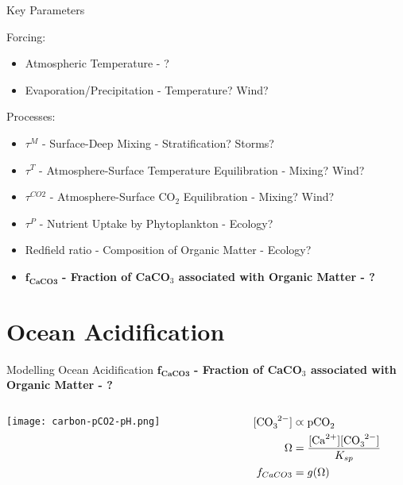 \begin{frame}{Key Parameters}
    
    Forcing:
    \begin{itemize}
        \item Atmospheric Temperature - {\color{QESdarkblue} ?}
        \item Evaporation/Precipitation - {\color{QESdarkblue} Temperature? Wind?}
    \end{itemize}

    Processes:
    \begin{itemize}
        \item $\tau^M$ - Surface-Deep Mixing - {\color{QESdarkblue} Stratification? Storms?}
        \item $\tau^T$ - Atmosphere-Surface Temperature Equilibration - {\color{QESdarkblue} Mixing? Wind?}
        \item $\tau^{CO2}$ - Atmosphere-Surface CO$_2$ Equilibration - {\color{QESdarkblue} Mixing? Wind?}
        \item $\tau^P$ - Nutrient Uptake by Phytoplankton - {\color{QESdarkblue} Ecology?}
        \item Redfield ratio - Composition of Organic Matter - {\color{QESdarkblue} Ecology?}
        \item $\mathbf{f_{CaCO3}}$ \textbf{- Fraction of CaCO$_3$ associated with Organic Matter - {\color{QESdarkblue} \ce{\Omega}?}}
    \end{itemize}

\end{frame}

\section{Ocean Acidification}

\begin{frame}{Modelling Ocean Acidification}
    $\mathbf{f_{CaCO3}}$ \textbf{- Fraction of CaCO$_3$ associated with Organic Matter - {\color{QESdarkblue} \ce{\Omega}?}}
    
    \bigskip
    \begin{columns}
        \begin{column}{0.5\linewidth}
            \centering
            \texttt{[image: carbon-pCO2-pH.png]}
        \end{column}
        \begin{column}{0.5\linewidth}
            \begin{align*}
                \ce{[CO3^{2-}]} &\varpropto \ce{pCO2}\\
                \Omega &= \frac{\ce{[Ca^{2+}][CO3^{2-}]}}{K_{sp}} \\
                f_{CaCO3} &= g(\Omega) \\
            \end{align*}
            
        \end{column}
    \end{columns}
\end{frame}

